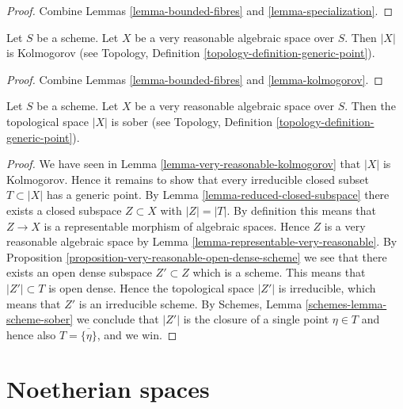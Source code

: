 \begin{proof}
Combine Lemmas \ref{lemma-bounded-fibres} and
\ref{lemma-specialization}.
\end{proof}

\begin{lemma}
\label{lemma-very-reasonable-kolmogorov}
Let $S$ be a scheme.
Let $X$ be a very reasonable algebraic space over $S$.
Then $|X|$ is Kolmogorov (see
Topology, Definition \ref{topology-definition-generic-point}).
\end{lemma}

\begin{proof}
Combine Lemmas \ref{lemma-bounded-fibres} and
\ref{lemma-kolmogorov}.
\end{proof}

\begin{proposition}
\label{proposition-very-reasonable-sober}
Let $S$ be a scheme.
Let $X$ be a very reasonable algebraic space over $S$.
Then the topological space $|X|$ is sober (see
Topology, Definition \ref{topology-definition-generic-point}).
\end{proposition}

\begin{proof}
We have seen in
Lemma \ref{lemma-very-reasonable-kolmogorov}
that $|X|$ is Kolmogorov.
Hence it remains to show that every irreducible closed subset
$T \subset |X|$ has a generic point. By
Lemma \ref{lemma-reduced-closed-subspace}
there exists a closed subspace $Z \subset X$ with $|Z| = |T|$.
By definition this means that $Z \to X$ is a representable morphism
of algebraic spaces. Hence $Z$ is a very reasonable algebraic space
by Lemma \ref{lemma-representable-very-reasonable}. By
Proposition \ref{proposition-very-reasonable-open-dense-scheme}
we see that there exists an open dense subspace $Z' \subset Z$
which is a scheme. This means that $|Z'| \subset T$ is open dense.
Hence the topological space $|Z'|$ is irreducible, which means that
$Z'$ is an irreducible scheme. By
Schemes, Lemma \ref{schemes-lemma-scheme-sober}
we conclude that $|Z'|$ is the closure of a single point $\eta \in T$
and hence also $T = \overline{\{\eta\}}$, and we win.
\end{proof}










\section{Noetherian spaces}
\label{section-noetherian}

